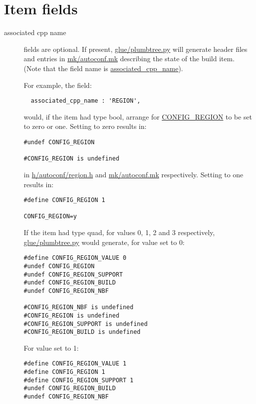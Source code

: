 \documentclass[a4paper]{article}
\begin{document}
\section{Item fields}

\begin{description}

\item[associated cpp name] fields are optional. If present,
\url{glue/plumbtree.py} will generate header files and entries in
\url{mk/autoconf.mk} describing the state of the build item. (Note
that the field name is \url{associated_cpp_name}).

For example, the field:

\begin{verbatim}
  associated_cpp_name : 'REGION',
\end{verbatim}

would, if the item had type bool, arrange for \url{CONFIG_REGION} to
be set to zero or one. Setting to zero results in:

\begin{verbatim}
#undef CONFIG_REGION

#CONFIG_REGION is undefined
\end{verbatim}

in \url{h/autoconf/region.h} and \url{mk/autoconf.mk}
respectively. Setting to one results in:

\begin{verbatim}
#define CONFIG_REGION 1

CONFIG_REGION=y
\end{verbatim}

If the item had type quad, for values 0, 1, 2 and 3 respectively,
\url{glue/plumbtree.py} would generate, for value set to 0:

\begin{small}
\begin{verbatim}
#define CONFIG_REGION_VALUE 0
#undef CONFIG_REGION
#undef CONFIG_REGION_SUPPORT
#undef CONFIG_REGION_BUILD
#undef CONFIG_REGION_NBF

#CONFIG_REGION_NBF is undefined
#CONFIG_REGION is undefined
#CONFIG_REGION_SUPPORT is undefined
#CONFIG_REGION_BUILD is undefined
\end{verbatim}
\end{small}

For value set to 1:
\begin{small}
\begin{verbatim}
#define CONFIG_REGION_VALUE 1
#define CONFIG_REGION 1
#define CONFIG_REGION_SUPPORT 1
#undef CONFIG_REGION_BUILD
#undef CONFIG_REGION_NBF


\end{verbatim}
\end{small}
\end{description}
\end{document}

